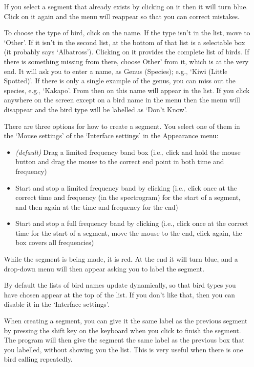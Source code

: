 \documentclass{article}
\begin{document}
If you select a segment that already exists by clicking on it then it will turn blue. Click on it again and the menu will reappear so that you can correct mistakes.

To choose the type of bird, click on the name. If the type isn't in the list, move to `Other'. If it isn't in the second list, at the bottom of that list is a selectable box (it probably says `Albatross'). Clicking on it provides the complete list of birds. If there is something missing from there, choose Other' from it, which is at the very end. It will ask you to enter a name, as Genus (Species); e.g., `Kiwi (Little Spotted)'. If there is only a single example of the genus, you can miss out the species, e.g., `Kakapo'. From then on this name will appear in the list. If you click anywhere on the screen except on a bird name in the menu then the menu will disappear and the bird type will be labelled as `Don't Know'. 

There are three options for how to create a segment. You select one of them in the `Mouse settings' of the `Interface settings' in the Appearance menu:
	\begin{itemize}
	\item {\em (default)} Drag a limited frequency band box (i.e., click and hold the mouse button and drag the mouse to the correct end point in both time and frequency)
	\item Start and stop a limited frequency band by clicking (i.e., click once at the correct time and frequency (in the spectrogram) for the start of a segment, and then again at the time and frequency for the end)
	\item Start and stop a full frequency band by clicking (i.e., click once at the correct time for the start of a segment, move the mouse to the end, click again, the box covers all frequencies)
	\end{itemize}

While the segment is being made, it is red. At the end it will turn blue, and a drop-down menu will then appear asking you to label the segment. 

By default the lists of bird names update dynamically, so that bird types you have chosen appear at the top of the list. If you don't like that, then you can disable it in the `Interface settings'. 

When creating a segment, you can give it the same label as the previous segment by pressing the shift key on the keyboard when you click to finish the segment. The program will then give the segment the same label as the previous box that you labelled, without showing you the list. This is very useful when there is one bird calling repeatedly.
\end{document}
